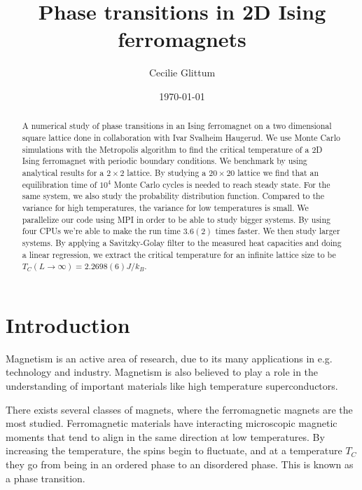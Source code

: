 \documentclass[%
 reprint,
nofootinbib,
aps,
]{revtex4-1}
\begin{document}

\title{Phase transitions in 2D Ising ferromagnets}%

\author{Cecilie Glittum}

%


\date{\today}%

\begin{abstract}
A numerical study of phase transitions in an Ising ferromagnet on a two dimensional square lattice done in collaboration with Ivar Svalheim Haugerud. We use Monte Carlo simulations with the Metropolis algorithm to find the critical temperature of a 2D Ising ferromagnet with periodic boundary conditions. We benchmark by using analytical results for a $2\times 2$ lattice. By studying a $20\times 20$ lattice we find that an equilibration time of $10^4$ Monte Carlo cycles is needed to reach steady state. For the same system, we also study the probability distribution function. Compared to the variance for high temperatures, the variance for low temperatures is small. We parallelize our code using MPI in order to be able to study bigger systems. By using four CPUs we're able to make the run time $3.6(2)$ times faster. We then study larger systems. By applying a Savitzky-Golay filter to the measured heat capacities and doing a linear regression, we extract the critical temperature for an infinite lattice size to be $T_C(L\to\infty) = 2.2698(6) J/k_B$.
\end{abstract}


\maketitle


\section{Introduction}

Magnetism is an active area of research, due to its many applications in e.g. technology and industry. Magnetism is also believed to play a role in the understanding of important materials like high temperature superconductors.

There exists several classes of magnets, where the ferromagnetic magnets are the most studied. Ferromagnetic materials have interacting microscopic magnetic moments that tend to align in the same direction at low temperatures. By increasing the temperature, the spins begin to fluctuate, and at a temperature $T_C$ they go from being in an ordered phase to an disordered phase. This is known as a phase transition.
\end{document}
